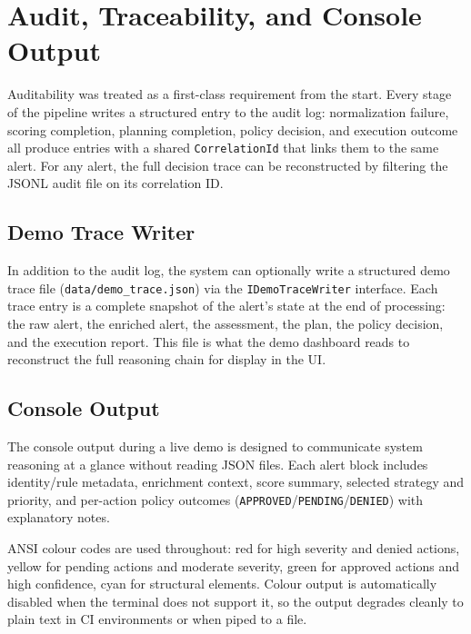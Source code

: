 \section{Audit, Traceability, and Console Output}
\label{sec:impl-audit}

Auditability was treated as a first-class requirement from the start. Every stage of the pipeline writes a structured entry to the audit log: normalization failure, scoring completion, planning completion, policy decision, and execution outcome all produce entries with a shared \texttt{CorrelationId} that links them to the same alert. For any alert, the full decision trace can be reconstructed by filtering the JSONL audit file on its correlation ID.

\subsection{Demo Trace Writer}

In addition to the audit log, the system can optionally write a structured demo trace file (\texttt{data/demo\_trace.json}) via the \texttt{IDemoTraceWriter} interface. Each trace entry is a complete snapshot of the alert's state at the end of processing: the raw alert, the enriched alert, the assessment, the plan, the policy decision, and the execution report. This file is what the demo dashboard reads to reconstruct the full reasoning chain for display in the UI.

\subsection{Console Output}

The console output during a live demo is designed to communicate system reasoning at a glance without reading JSON files. Each alert block includes identity/rule metadata, enrichment context, score summary, selected strategy and priority, and per-action policy outcomes (\texttt{APPROVED}/\texttt{PENDING}/\texttt{DENIED}) with explanatory notes.

ANSI colour codes are used throughout: red for high severity and denied actions, yellow for pending actions and moderate severity, green for approved actions and high confidence, cyan for structural elements. Colour output is automatically disabled when the terminal does not support it, so the output degrades cleanly to plain text in CI environments or when piped to a file.

